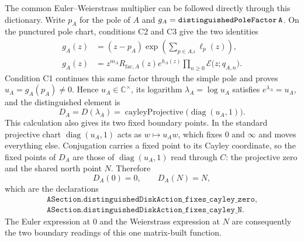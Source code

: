 \documentclass[11pt]{article}
\newcommand{\CC}{\mathbb{C}}
\theoremstyle{plain}
\theoremstyle{definition}
\theoremstyle{remark}
\begin{document}
\begin{tcolorbox}
The common Euler--Weierstrass multiplier can be followed directly through this dictionary. Write
$p_A$ for the pole of $A$ and $g_A=\texttt{distinguishedPoleFactor\,A}$. On the punctured pole chart, conditions
\textup{C2} and \textup{C3} give the two identities
\[
\begin{aligned}
 g_A(z)
   &=(z-p_A)
     \exp\!\left(\sum_{p\in A.\iota}\ell_p(z)\right),\\[2pt]
 g_A(z)
   &=z^{m_A}R_{\mathrm{fac},A}(z)e^{h_A(z)}
     \prod_{n\geq0}\mathcal E\bigl(z;q_{A,n}\bigr).
\end{aligned}
\]
Condition \textup{C1} continues this same factor through the simple pole and proves
$u_A=g_A(p_A)\neq0$. Hence $u_A\in\CC^\times$, its logarithm
$\lambda_A=\log u_A$ satisfies $e^{\lambda_A}=u_A$, and the distinguished element is
\[
 D_A=D(\lambda_A)
   =\operatorname{cayleyProjective}\bigl(\operatorname{diag}(u_A,1)\bigr).
\]
This calculation also gives its two fixed boundary points. In the standard
projective chart $\operatorname{diag}(u_A,1)$ acts as $w\mapsto u_Aw$, which
fixes $0$ and $\infty$ and moves everything else. Conjugation carries a fixed
point to its Cayley coordinate, so the fixed points of $D_A$ are those of
$\operatorname{diag}(u_A,1)$ read through $C$: the projective zero and the
shared north point $N$. Therefore
\[
  D_A(0)=0,\qquad D_A(N)=N,
\]
which are the declarations
\[
\begin{gathered}
\texttt{ASection.distinguishedDiskAction\_fixes\_cayley\_zero},\\
\texttt{ASection.distinguishedDiskAction\_fixes\_cayley\_N}.
\end{gathered}
\]
The Euler expression at $0$ and the
Weierstrass expression at $N$ are consequently the two boundary readings of this one matrix-built
function.


\end{tcolorbox}
\end{document}
